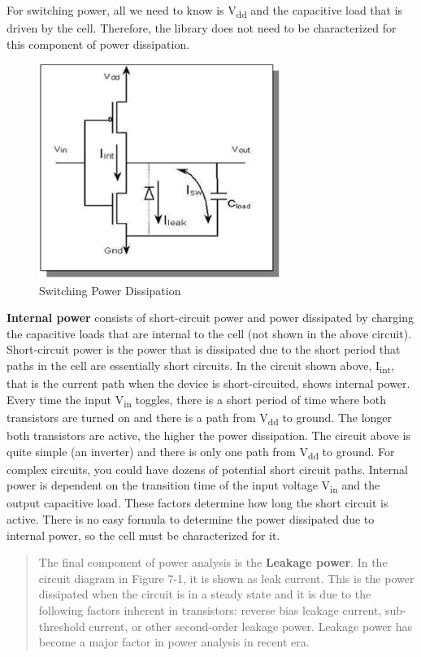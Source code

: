 For switching power, all we need to know is V\textsubscript{dd} and the
capacitive load that is driven by the cell. Therefore, the library does
not need to be characterized for this component of power dissipation.
\begin{figure}[!htb]
	\centering
	\includegraphics[width=0.7\textwidth]{src/images/7-1.png}
	\caption{Switching Power Dissipation}
	\label{fig:fig71}
\end{figure}
\textbf{Internal power} consists of short-circuit power and power
dissipated by charging the capacitive loads that are internal to the
cell (not shown in the above circuit). Short-circuit power is the power
that is dissipated due to the short period that paths in the cell are
essentially short circuits. In the circuit shown above,
I\textsubscript{int}, that is the current path when the device is
short-circuited, shows internal power. Every time the input
V\textsubscript{in} toggles, there is a short period of time where both
transistors are turned on and there is a path from V\textsubscript{dd}
to ground. The longer both transistors are active, the higher the power
dissipation. The circuit above is quite simple (an inverter) and there
is only one path from V\textsubscript{dd} to ground. For complex
circuits, you could have dozens of potential short circuit paths.
Internal power is dependent on the transition time of the input voltage
V\textsubscript{in} and the output capacitive load. These factors
determine how long the short circuit is active. There is no easy formula
to determine the power dissipated due to internal power, so the cell
must be characterized for it.

\begin{quote}
The final component of power analysis is the \textbf{Leakage power}. In
the circuit diagram in Figure 7-1, it is shown as leak current. This is
the power dissipated when the circuit is in a steady state and it is due
to the following factors inherent in transistors: reverse bias leakage
current, sub-threshold current, or other second-order leakage power.
Leakage power has become a major factor in power analysis in recent era.
\end{quote}

